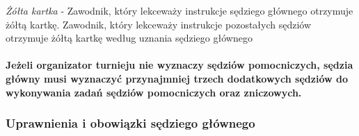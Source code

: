 \documentclass[12pt]{article}
\begin{document}
\emph{Żółta kartka} - Zawodnik, który lekceważy instrukcje sędziego
głównego otrzymuje żółtą kartkę. Zawodnik, który lekceważy instrukcje
pozostałych sędziów otrzymuje żółtą kartkę według uznania sędziego
głównego

\paragraph{Jeżeli organizator turnieju nie wyznaczy sędziów
	pomocniczych, sędzia główny musi wyznaczyć przynajmniej trzech
	dodatkowych sędziów do wykonywania zadań sędziów pomocniczych oraz
	zniczowych.}

\subsubsection{Uprawnienia i obowiązki sędziego głównego}
\end{document}
